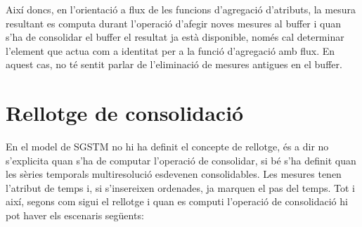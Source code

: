 Així doncs, en l'orientació a flux de les funcions d'agregació
d'atributs, la mesura resultant es computa durant l'operació d'afegir
noves mesures al buffer i quan s'ha de consolidar el buffer el
resultat ja està disponible, només cal determinar l'element que actua
com a identitat per a la funció d'agregació amb flux.  En aquest cas,
no té sentit parlar de l'eliminació de mesures antigues en el buffer.










\section{Rellotge de consolidació}


En el model de \gls{SGSTM} no hi ha definit el concepte de rellotge,
és a dir no s'explicita quan s'ha de computar l'operació de
consolidar, si bé s'ha definit quan les sèries temporals
multiresolució esdevenen consolidables.  Les mesures tenen l'atribut
de temps i, si s'insereixen ordenades, ja marquen el pas del temps.
Tot i així, segons com sigui el rellotge i quan es computi l'operació
de consolidació hi pot haver els escenaris següents:

